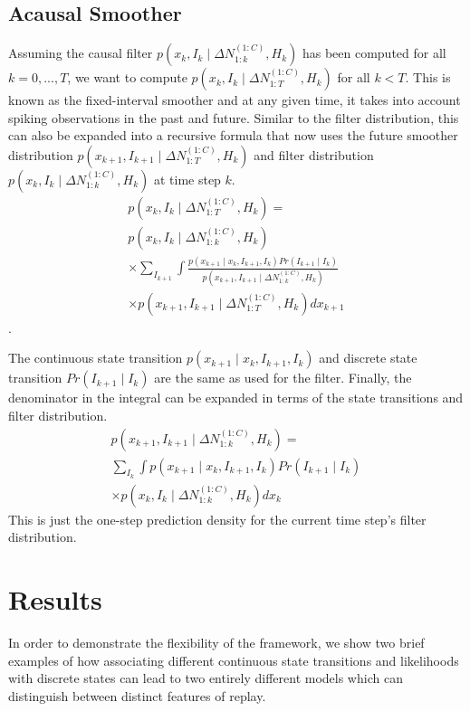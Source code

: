 \documentclass[conference]{IEEEtran}
\begin{document}
\subsection{Acausal Smoother}
Assuming the causal filter $p(x_{k}, I_{k} \mid \Delta N_{1:k}^{(1:C)}, H_{k})$ has been computed for all $k = 0, ..., T$, we want to compute $p(x_{k}, I_{k} \mid \Delta N_{1:T}^{(1:C)}, H_{k})$ for all $k < T$. This is known as the fixed-interval smoother and at any given time, it takes into account spiking observations in the past and future. Similar to the filter distribution, this can also be expanded into a recursive formula that now uses the future smoother distribution $p(x_{k+1}, I_{k+1} \mid \Delta N_{1:T}^{(1:C)}, H_{k})$ and filter distribution $p(x_{k}, I_{k} \mid \Delta N_{1:k}^{(1:C)}, H_{k})$ at time step $k$.
\begin{multline}
p(x_{k}, I_{k} \mid \Delta N_{1:T}^{(1:C)}, H_{k}) = \\
p(x_{k}, I_{k} \mid \Delta N_{1:k}^{(1:C)}, H_{k})\\
\times \sum_{I_{k+1}} \int \frac{p(x_{k+1} \mid x_{k}, I_{k+1}, I_{k})
Pr(I_{k+1} \mid I_{k})}{p(x_{k+1}, I_{k+1} \mid \Delta N_{1:k}^{(1:C)}, H_{k})} \\
\times p(x_{k+1}, I_{k+1} \mid \Delta N_{1:T}^{(1:C)}, H_{k}) dx_{k+1}
\end{multline}.

The continuous state transition $p(x_{k+1} \mid x_{k}, I_{k+1}, I_{k})$ and discrete state transition $Pr(I_{k+1} \mid I_{k})$ are the same as used for the filter. Finally, the denominator in the integral can be expanded in terms of the state transitions and filter distribution.
\begin{multline}
p(x_{k+1}, I_{k+1} \mid \Delta N_{1:k}^{(1:C)}, H_{k}) = \\
\sum_{I_{k}} \int p(x_{k+1} \mid x_{k}, I_{k+1}, I_{k}) Pr(I_{k+1} \mid I_{k}) \\
\times p(x_{k}, I_{k} \mid \Delta N_{1:k}^{(1:C)}, H_{k}) dx_{k}
\end{multline}
This is just the one-step prediction density for the current time step's filter distribution.

\section{Results}
In order to demonstrate the flexibility of the framework, we show two brief examples of how associating different continuous state transitions and likelihoods with discrete states can lead to two entirely different models which can distinguish between distinct features of replay.
\end{document}
